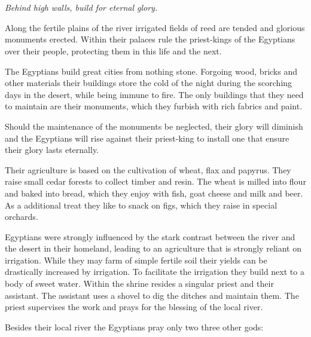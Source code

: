 \section{}\label{ch:Tribes:Egyptians}

\begin{flushright}
	\emph{Behind high walls, build for eternal glory.}
\end{flushright}

Along the fertile plains of the river irrigated fields of reed are tended and
glorious monuments erected. Within their palaces rule the priest-kings of the
\gls{Egyptians} over their people, protecting them in this life and the next.

The \gls{Egyptians} build great cities from nothing stone. Forgoing wood,
bricks and other materials their buildings store the cold of the night during
the scorching days in the desert, while being immune to fire. The only
buildings that they need to maintain are their monuments, which they furbish
with rich fabrics and paint.

Should the maintenance of the monuments be neglected, their glory will diminish
and the \gls{Egyptians} will rise against their priest-king to install one that
ensure their glory lasts eternally.

Their agriculture is based on the cultivation of wheat, flax and papyrus. They
raise small cedar forests to collect timber and resin. The wheat is milled into
flour and baked into bread, which they enjoy with fish, goat cheese and milk
and beer. As a additional treat they like to snack on figs, which they raise in
special orchards.

\Gls{Egyptians} were strongly influenced by the stark contrast between
the river and the desert in their homeland,
leading to an agriculture that is strongly reliant on irrigation.
While they may farm of simple fertile soil their yields can be drastically
increased by irrigation.
To facilitate the irrigation they build  next to a body of sweet water.
Within the shrine resides a singular priest and their assistant.
The assistant uses a shovel to dig the ditches and maintain them.
The priest supervises the work and prays for the blessing of the local river.

Besides their local river the \gls{Egyptians} pray only two three other gods:

